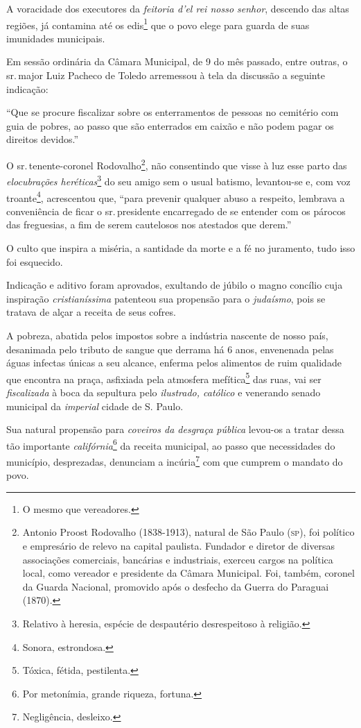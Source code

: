 A voracidade dos executores da \emph{feitoria d'el rei nosso senhor},
descendo das altas regiões, já contamina até os edis\footnote{O mesmo
  que vereadores.} que o povo elege para guarda de suas imunidades
municipais.

Em sessão ordinária da Câmara Municipal, de 9 do mês passado, entre
outras, o sr.\,major Luiz Pacheco de Toledo arremessou à tela da
discussão a seguinte indicação:

``Que se procure fiscalizar sobre os enterramentos de pessoas no
cemitério com guia de pobres, ao passo que são enterrados em caixão e
não podem pagar os direitos devidos.''

O sr.\,tenente-coronel Rodovalho\footnote{Antonio Proost Rodovalho
  (1838-1913), natural de São Paulo (\textsc{sp}), foi político e empresário de
  relevo na capital paulista. Fundador e diretor de diversas associações
  comerciais, bancárias e industriais, exerceu cargos na política local,
  como vereador e presidente da Câmara Municipal. Foi, também, coronel
  da Guarda Nacional, promovido após o desfecho da Guerra do Paraguai
  (1870).}, não consentindo que visse à luz esse parto das
\emph{elocubrações heréticas}\footnote{Relativo à heresia, espécie de
  despautério desrespeitoso à religião.} do seu amigo sem o usual
batismo, levantou-se e, com voz troante\footnote{Sonora, estrondosa.},
acrescentou que, ``para prevenir qualquer abuso a respeito, lembrava a
conveniência de ficar o sr.\,presidente encarregado de se entender com os
párocos das freguesias, a fim de serem cautelosos nos atestados que
derem.''

O culto que inspira a miséria, a santidade da morte e a fé no juramento,
tudo isso foi esquecido.

Indicação e aditivo foram aprovados, exultando de júbilo o magno
concílio cuja inspiração \emph{cristianíssima} patenteou sua propensão
para o \emph{judaísmo}, pois se tratava de alçar a receita de seus
cofres.

A pobreza, abatida pelos impostos sobre a indústria nascente de nosso
país, desanimada pelo tributo de sangue que derrama há 6 anos,
envenenada pelas águas infectas únicas a seu alcance, enferma pelos
alimentos de ruim qualidade que encontra na praça, asfixiada pela
atmosfera mefítica\footnote{Tóxica, fétida, pestilenta.} das ruas, vai
ser \emph{fiscalizada} à boca da sepultura pelo \emph{ilustrado,
católico} e venerando senado municipal da \emph{imperial} cidade de S.
Paulo.

Sua natural propensão para \emph{coveiros da desgraça pública} levou-os
a tratar dessa tão importante \emph{califórnia}\footnote{Por
  metonímia, grande riqueza, fortuna.} da receita municipal, ao passo
que necessidades do município, desprezadas, denunciam a
incúria\footnote{Negligência, desleixo.} com que cumprem o mandato do
povo.

